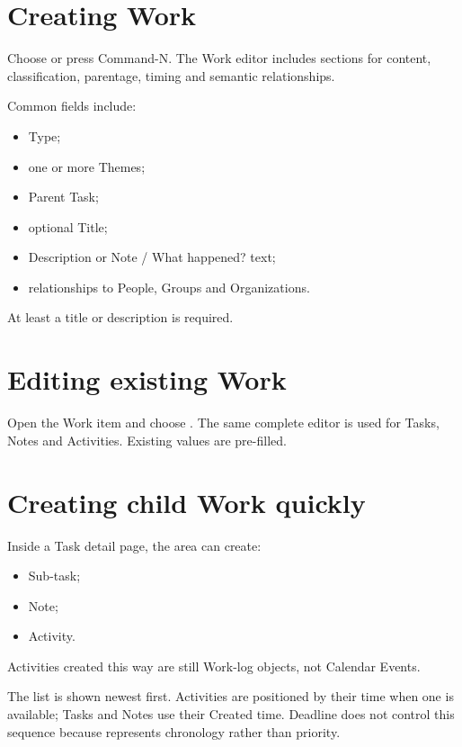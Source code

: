 \documentclass{testudomanual}
\begin{document}
\section{Creating Work}

Choose  or press Command-N. The Work editor includes sections for content, classification, parentage, timing and semantic relationships.

Common fields include:
\begin{itemize}
    \item Type;
    \item one or more Themes;
    \item Parent Task;
    \item optional Title;
    \item Description or Note / What happened? text;
    \item relationships to People, Groups and Organizations.
\end{itemize}

At least a title or description is required.

\section{Editing existing Work}

Open the Work item and choose . The same complete editor is used for Tasks, Notes and Activities. Existing values are pre-filled.

\section{Creating child Work quickly}

Inside a Task detail page, the  area can create:
\begin{itemize}
    \item Sub-task;
    \item Note;
    \item Activity.
\end{itemize}

Activities created this way are still Work-log objects, not Calendar Events.

The  list is shown newest first. Activities are positioned by their  time when one is available; Tasks and Notes use their Created time. Deadline does not control this sequence because  represents chronology rather than priority.
\end{document}
